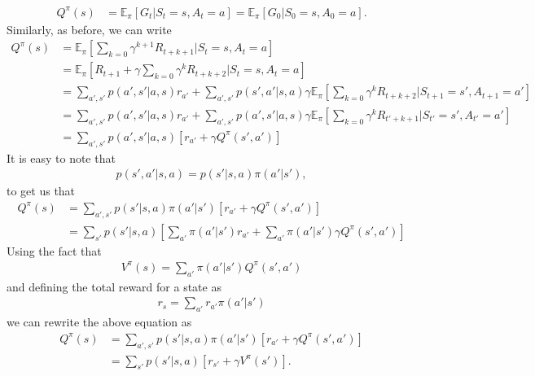 \begin{enumerate}
     \begin{align}
        Q^{\pi}(s) &= \mathds{E}_{\pi}\left[ G_{t}|S_t = s, A_t = a \right] = \mathds{E}_{\pi}\left[ G_{0}|S_0 = s, A_0 = a \right]. 
    \end{align}
    Similarly, as before, we can write 
    \begin{align}
        Q^{\pi}(s) &= \mathds{E}_{\pi}\left[ \sum_{k=0} \gamma^{k+1} R_{t+k+1}  |S_t = s, A_t = a \right] \\
        &= \mathds{E}_{\pi}\left[ R_{t+1} +  \gamma \sum_{k=0} \gamma^{k} R_{t+k+2}  |S_t = s,A_t = a \right]\\
        &= \sum_{a',s'} p(a',s'|a,s) r_{a'} + \sum_{a',s'} p(s',a'|s,a) 
        \gamma \mathds{E}_{\pi}\left[ \sum_{k=0} \gamma^{k} R_{t+k+2}  |S_{t+1} = s', A_{t+1} = a' \right] \\
        &=  \sum_{a',s'} p(a',s'|a,s) r_{a'} + \sum_{a',s'} p(a',s'|a,s) 
        \gamma \mathds{E}_{\pi}\left[ \sum_{k=0} \gamma^{k} R_{t'+k+1}  |S_{t'} = s', A_{t'} = a' \right] \\
        &= \sum_{a',s'} p(a',s'|a,s)\left[ r_{a'} + \gamma Q^{\pi}(s',a') \right]  \label{eq:Bellman_eqn_for_Q_function_v1}
    \end{align}
    It is easy to note that 
    \begin{align}
        p(s',a'|s,a) = p(s'|s,a)\pi(a'|s'),
    \end{align}
    to get us that 
    \begin{align}
        Q^{\pi}(s) &= \sum_{a',s'} p(s'|s,a)\pi(a'|s')\left[ r_{a'} + \gamma Q^{\pi}(s',a') \right] \\
        &=\sum_{s'} p(s'|s,a)\left[\sum_{a'}\pi(a'|s') r_{a'} + \sum_{a'}\pi(a'|s') \gamma Q^{\pi}(s',a') \right]
    \end{align}
    Using the fact that 
    \begin{align}
        V^{\pi}(s) = \sum_{a'}\pi(a'|s')Q^{\pi}(s',a') 
    \end{align}
    and defining the total reward for a state as 
    \begin{align}
        r_s = \sum_{a'} r_{a'} \pi(a'|s')
    \end{align}
    we can rewrite the above equation as
    \begin{align}\label{eq:Bellman_eqn_for_Q_function_v2}
        Q^{\pi}(s) &= \sum_{a',s'} p(s'|s,a)\pi(a'|s')\left[ r_{a'} + \gamma Q^{\pi}(s',a') \right] \\
        &=\sum_{s'} p(s'|s,a)\left[r_{s'} +  \gamma V^{\pi}(s') \right].

\end{align}
\end{enumerate}
